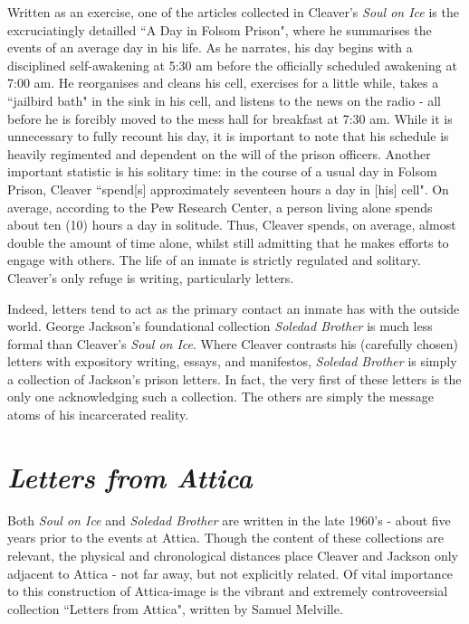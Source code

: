 \documentclass[14pt, letterpaper]{report}
\begin{document}
	Written as an exercise, one of the articles collected in Cleaver's 
	\textit{Soul on Ice} is the excruciatingly detailled ``A Day in Folsom
	Prison", where he summarises the events of an average day in his life. 
	As he narrates, his day begins with a disciplined self-awakening at 
	5:30 am before 
	the officially scheduled awakening at 7:00 am. He 
	reorganises and cleans his cell, exercises for a little while, 
	takes a ``jailbird bath" in the sink in his cell, and listens to 
	the news on the radio - all before he is forcibly moved to the mess hall 
	for breakfast at 7:30 am. \autocite[64]{soul-on-ice} While it is unnecessary 
	to fully recount his day, it is important to note that his schedule is 
	heavily regimented and dependent on the will of the prison officers. 
	Another important statistic is his solitary time: in the course of a 
	usual day in Folsom Prison, Cleaver ``spend[s] approximately seventeen 
	hours a day in [his] cell". On average, according to the Pew Research 
	Center, a person living alone spends about ten (10) hours a day in 
	solitude. \autocite{pew-alone} Thus, Cleaver spends, on average, almost 
	double the amount of time alone, whilst still admitting that he makes 
	efforts to engage with others. The life of an inmate is strictly regulated and 
	solitary. Cleaver's only refuge is writing, particularly letters. 
	
	Indeed, letters 	tend to act as the primary contact an inmate has with the 
	outside world. George Jackson's foundational collection \textit{Soledad Brother} 
	is much less formal than Cleaver's \textit{Soul on Ice}. Where Cleaver contrasts 
	his (carefully chosen) letters with expository writing, essays, and manifestos, 
	\textit{Soledad Brother} is simply a collection of Jackson's prison letters. 
	In fact, the very first of these letters is the only one acknowledging such a 
	collection. The others are simply the message atoms of his incarcerated reality.
	
	\section*{\textit{Letters from Attica}}
	
	Both \textit{Soul on Ice} and \textit{Soledad Brother} are written in the 
	late 1960's - about five years prior to the events at Attica. Though the 
	content of these collections are relevant, the physical and chronological 
	distances place Cleaver and Jackson only adjacent to Attica - not far away,
	but not explicitly related. Of vital importance to this construction of 
	Attica-image is the vibrant and extremely controveersial collection 
	``Letters from Attica", written by Samuel Melville. 
	
\end{document}
